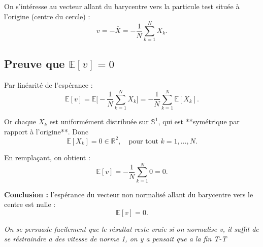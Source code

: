 \documentclass{article}
\begin{document}
On s'intéresse au vecteur allant du barycentre vers la particule test située à l'origine (centre du cercle) :
\[
v = -\bar{X} = - \frac{1}{N} \sum_{k=1}^{N} X_k.
\]

\subsection*{Preuve que $\mathbb{E}[v] = 0$}

Par linéarité de l'espérance :
\[
\mathbb{E}[v] = \mathbb{E}\Big[- \frac{1}{N} \sum_{k=1}^{N} X_k \Big]
= - \frac{1}{N} \sum_{k=1}^{N} \mathbb{E}[X_k].
\]

Or chaque $X_k$ est uniformément distribuée sur $\mathbb{S}^1$, qui est **symétrique par rapport à l'origine**.  
Donc
\[
\mathbb{E}[X_k] = 0 \in \mathbb{R}^2, \quad \text{pour tout } k=1,\dots,N.
\]

En remplaçant, on obtient :
\[
\mathbb{E}[v] = - \frac{1}{N} \sum_{k=1}^{N} 0 = 0.
\]

\noindent
\textbf{Conclusion :} l'espérance du vecteur non normalisé allant du barycentre vers le centre est nulle :
\[
\boxed{\mathbb{E}[v] = 0}.
\]

\textit{On se persuade facilement que le résultat reste vraie si on normalise v, il suffit de se réstraindre a des vitesse de norme 1, on y a pensait que a la fin T-T}
\end{document}
